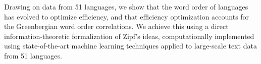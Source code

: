 \documentclass[9pt,twocolumn,twoside,lineno]{pnas-new}
\begin{document}
Drawing on data from 51 languages, we show  that the word order of languages has evolved to optimize efficiency, and that efficiency optimization accounts for the Greenbergian word order correlations.
We achieve this using a direct information-theoretic formalization of Zipf's ideas, computationally implemented using state-of-the-art machine learning techniques applied to large-scale text data from 51 languages.









%
%
%
\end{document}
